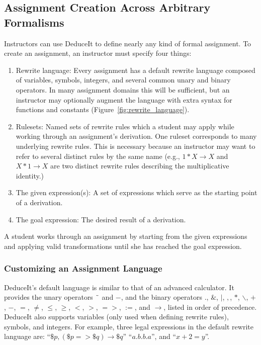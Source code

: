 \documentclass{sigchi}
\newcommand{\msb}[1]{\textbf{\textcolor{cyan}{Michael: #1}}}
\begin{document}
\subsection{Assignment Creation Across Arbitrary Formalisms}

Instructors can use DeduceIt to define nearly any kind of formal assignment. To create an assignment, an instructor must specify four things: 
  \begin{enumerate}
  \item Rewrite language: Every assignment has a default rewrite language composed of variables, symbols, integers, and several common unary and binary operators. In many assignment domains this will be sufficient, but an instructor may optionally augment the language with extra syntax for functions and constants (Figure~\ref{fig:rewrite_language}). 
  \item Rulesets: Named sets of rewrite rules which a student may apply while working through an assignment's derivation. One ruleset corresponds to many underlying rewrite rules. This is necessary because an instructor may want to refer to several distinct rules by the same name (e.g., $1*X \rightarrow X$ and $X*1 \rightarrow X$ are two distinct rewrite rules describing the multiplicative identity.)
  \item The given expression(s): A set of expressions which serve as the starting point of a derivation.
  \item The goal expression: The desired result of a derivation.
  \end{enumerate}

A student works through an assignment by starting from the given expressions and applying valid transformations until she has reached the goal expression. %

\subsubsection{Customizing an Assignment Language}

DeduceIt's default language is similar to that of an advanced calculator. It provides the unary operators $\char`\~$ and $-$, and the binary operators $.$, $\&$, $|$, $,$, $*$, $\backslash$, $+$, $-$, $=$, $\neq$, $\leq$, $\geq$, $<$, $>$, $=>$, $:=$, and $\rightarrow$, listed in order of precedence. DeduceIt also supports variables (only used when defining rewrite rules), symbols, and integers. For example, three legal expressions in the default rewrite language are: ``$\$p,(\$p=>\$q)\rightarrow{}\$q$'' ``$a.b.b.a$'', and ``$x+2=y$''.
\end{document}
